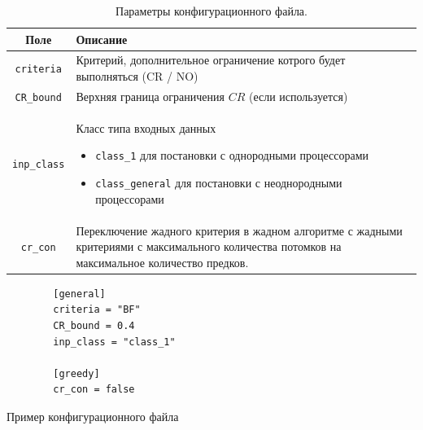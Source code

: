 \begin{table}[!htbp]
    \centering
    \begin{tabularx}{\textwidth}{|c|X|}
        \hline
        Поле                & Описание                                                                                                                                      \\
        \hline
        \texttt{criteria}   & Критерий, дополнительное ограничение котрого будет выполняться (CR / NO)                                                                      \\
        \hline
        \texttt{CR\_bound}  & Верхняя граница ограничения $CR$ (если используется)                                                                                          \\
        \hline
        \texttt{inp\_class} & Класс типа входных данных
        \begin{itemize}
            \item \texttt{class\_1} для постановки с однородными процессорами
            \item \texttt{class\_general} для постановки с неоднородными процессорами
        \end{itemize}                                                                                            \\
        \hline
        \texttt{cr\_con}    & Переключение жадного критерия в жадном алгоритме с жадными критериями с максимального количества потомков на максимальное количество предков. \\
        \hline
    \end{tabularx}
    \caption{Параметры конфигурационного файла.}
    \label{tbl:config-file-parameters}
\end{table}
\begin{listing}
    \begin{verbatim}
        [general] 
        criteria = "BF" 
        CR_bound = 0.4 
        inp_class = "class_1" 
        
        [greedy] 
        cr_con = false
    \end{verbatim}
    \caption{Пример конфигурационного файла}
    \label{lst:config-file}
\end{listing}

